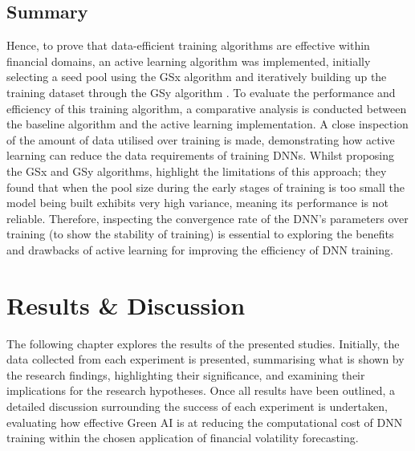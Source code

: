 \documentclass[a4paper, 11pt]{report}
\begin{document}
    \section{Summary}

    Hence, to prove that data-efficient training algorithms are effective within financial domains, an active learning algorithm was implemented, initially selecting a seed pool using the GSx algorithm and iteratively building up the training dataset through the GSy algorithm \citep{wu-2019}. To evaluate the performance and efficiency of this training algorithm, a comparative analysis is conducted between the baseline algorithm and the active learning implementation. A close inspection of the amount of data utilised over training is made, demonstrating how active learning can reduce the data requirements of training DNNs. Whilst proposing the GSx and GSy algorithms, \citet{wu-2019} highlight the limitations of this approach; they found that when the pool size during the early stages of training is too small the model being built exhibits very high variance, meaning its performance is not reliable. Therefore, inspecting the convergence rate of the DNN's parameters over training (to show the stability of training) is essential to exploring the benefits and drawbacks of active learning for improving the efficiency of DNN training.


    \newpage
    \chapter{Results \& Discussion}
    \label{chapter: results-discussion}

    The following chapter explores the results of the presented studies. Initially, the data collected from each experiment is presented, summarising what is shown by the research findings, highlighting their significance, and examining their implications for the research hypotheses. Once all results have been outlined, a detailed discussion surrounding the success of each experiment is undertaken, evaluating how effective Green AI is at reducing the computational cost of DNN training within the chosen application of financial volatility forecasting.
    
\end{document}
